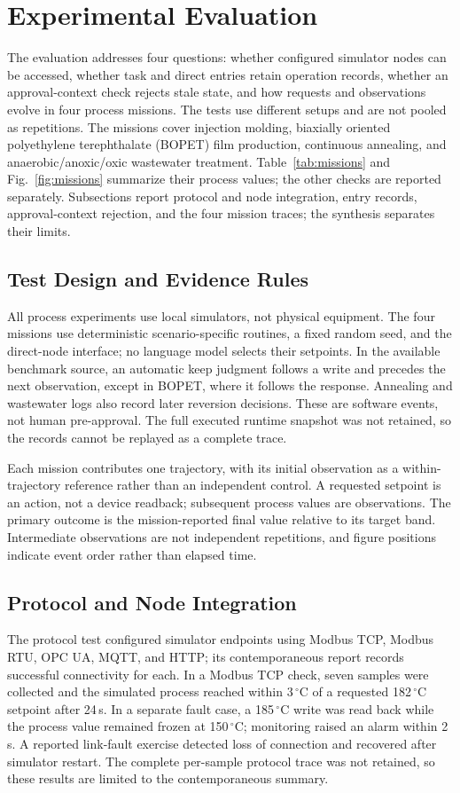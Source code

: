 \section{Experimental Evaluation}
\label{sec:eval}
The evaluation addresses four questions: whether configured simulator nodes
can be accessed, whether task and direct entries retain operation records,
whether an approval-context check rejects stale state, and how requests and
observations evolve in four process missions. The tests use different setups
and are not pooled as repetitions. The missions cover injection molding,
biaxially oriented polyethylene terephthalate (BOPET) film production,
continuous annealing, and anaerobic/anoxic/oxic wastewater treatment.
Table~\ref{tab:missions} and Fig.~\ref{fig:missions} summarize their process
values; the other checks are reported separately. Subsections report protocol
and node integration, entry records, approval-context rejection, and the four
mission traces; the synthesis separates their limits.

\subsection{Test Design and Evidence Rules}
\label{sec:eval-protocol}
All process experiments use local simulators, not physical equipment. The
four missions use deterministic scenario-specific routines, a fixed random
seed, and the direct-node interface; no language model selects their setpoints.
In the available benchmark source, an automatic keep judgment follows a write
and precedes the next observation, except in BOPET, where it follows the
response. Annealing and wastewater logs also record later reversion decisions.
These are software events, not human pre-approval. The full executed runtime
snapshot was not retained, so the records cannot be replayed as a complete
trace.

Each mission contributes one trajectory, with its initial observation as a
within-trajectory reference rather than an independent control. A requested
setpoint is an action, not a device readback; subsequent process values are
observations. The primary outcome is the mission-reported final value relative
to its target band. Intermediate observations are not independent repetitions,
and figure positions indicate event order rather than elapsed time.

\subsection{Protocol and Node Integration}
The protocol test configured simulator endpoints using Modbus TCP, Modbus RTU,
OPC UA, MQTT, and HTTP; its contemporaneous report records successful
connectivity for each. In a Modbus TCP check, seven samples were collected
and the simulated process reached within 3\,$^{\circ}$C of a requested
182\,$^{\circ}$C setpoint after 24\,s. In a separate fault case, a
185\,$^{\circ}$C write was read back while the process value remained frozen
at 150\,$^{\circ}$C; monitoring raised an alarm within 2\,s. A reported
link-fault exercise detected loss of connection and recovered after simulator
restart. The complete per-sample protocol trace was not retained, so these
results are limited to the contemporaneous summary.

